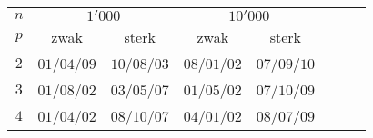 \begin{tabular}{cccccccc}
\toprule
$n$&\multicolumn{2}{c}{$1'000$}&\multicolumn{2}{c}{$10'000$}\\
$p$&zwak&sterk&zwak&sterk\\\midrule
$2$&$01$/$04$/$09$&$10$/$08$/$03$&$08$/$01$/$02$&$07$/$09$/$10$\\
$3$&$01$/$08$/$02$&$03$/$05$/$07$&$01$/$05$/$02$&$07$/$10$/$09$\\
$4$&$01$/$04$/$02$&$08$/$10$/$07$&$04$/$01$/$02$&$08$/$07$/$09$\\
\bottomrule
\end{tabular}